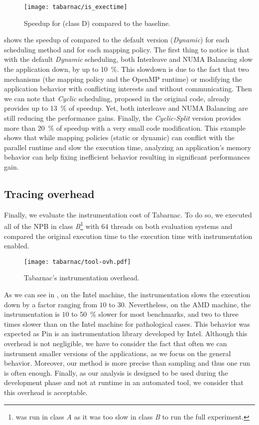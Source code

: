 \begin{figure}[htb]
    \centering
    \texttt{[image: tabarnac/is\_exectime]}
    \caption[Speedup for \IS.]{Speedup for \IS (class D) compared to the baseline.}
\label{fig:is-res}
\end{figure}

 shows the speedup of \IS compared to the default version (\emph{Dynamic}) for each scheduling method and for each mapping policy.
The first thing to notice is that with the default \emph{Dynamic} scheduling, both Interleave and \gls{NUMA} Balancing slow the application down, by up to \SI{10}{\%}.
This slowdown is due to the fact that two mechanisms (the mapping policy and the \gls{OpenMP} runtime) or modifying the application behavior with conflicting interests and without communicating.
Then we can note that \emph{Cyclic} scheduling, proposed in the original code, already provides up to \SI{13}{\%} of speedup.
Yet, both interleave and \gls{NUMA} Balancing are still reducing the performance gains.
Finally, the \emph{Cyclic-Split} version provides more than \SI{20}{\%} of speedup with a very small code modification.
This example shows that while mapping policies (static or dynamic) can conflict with the parallel runtime and slow the execution time, analyzing an application's memory behavior can help fixing inefficient behavior resulting in significant performances gain.

\subsection{Tracing overhead}

Finally,  we evaluate the instrumentation cost of \gls{Tabarnac}.
To do so, we executed all of the \gls{NPB} in class \emph{B}\footnote{
    \DC was run in class \emph{A} as it was too slow in class \emph{B} to run the full experiment.
} with $64$ threads on both evaluation systems and compared the original execution time to the execution time with instrumentation enabled.

\begin{figure}[htb]
    \centering
    \texttt{[image: tabarnac/tool-ovh.pdf]}
    \caption{Tabarnac's instrumentation overhead.}
    \label{fig:ovh-tabarnac}
\end{figure}

As we can see in , on the Intel machine, the instrumentation slows the execution down by a factor ranging from $10$ to $30$.
Nevertheless, on the \gls{AMD} machine, the instrumentation is $10$ to \SI{50}{\%} slower for most benchmarks, and two to three times slower than on the \gls{Intel} machine for pathological cases.
This behavior was expected as \gls{Pin} is an instrumentation library developed by \gls{Intel}.
Although this overhead is not negligible, we have to consider the fact that often we can instrument smaller versions of the applications, as we focus on the general behavior.
Moreover, our method is more precise than sampling and thus one run is often enough.
Finally, as our analysis is designed to be used during the development phase and not at runtime in an automated tool, we consider that this overhead is acceptable.


